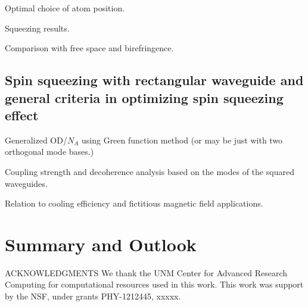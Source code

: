 \documentclass[preprint,aps,pra,onecolumn,superscriptaddress]{revtex4-1} %
\begin{document}
Optimal choice of atom position.

Squeezing results.

Comparison with free space and birefringence.

\subsection{Spin squeezing with rectangular waveguide and general criteria in optimizing spin squeezing effect} \label{Sec::Waveguide}

Generalized OD/$N_A$ using Green function method (or may be just with two orthogonal mode bases.)

Coupling strength and decoherence analysis based on the modes of the squared waveguides.

Relation to cooling efficiency and fictitious magnetic field applications.

\section{Summary and Outlook} \label{Sec::Conclusion}


ACKNOWLEDGMENTS
We thank the UNM Center for Advanced Research Computing for computational resources used in this work.
This work was support by the NSF, under grants PHY-1212445, xxxxx.

\end{document}
